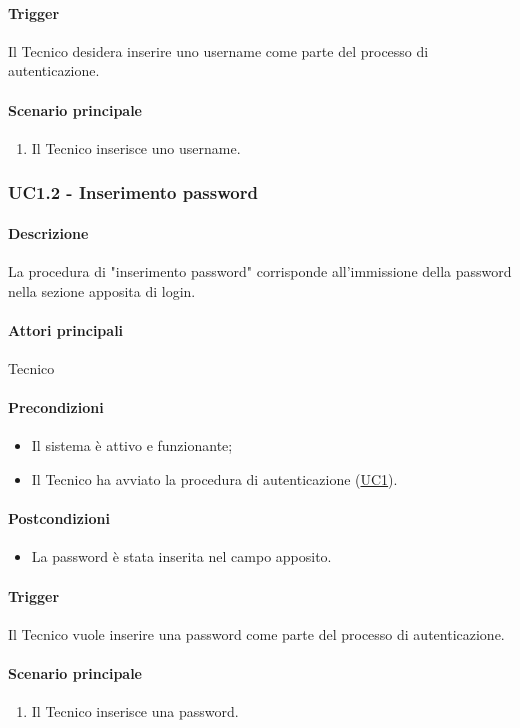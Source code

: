 \paragraph*{Trigger}
Il Tecnico desidera inserire uno username come parte del processo di autenticazione.

\paragraph*{Scenario principale}
\begin{enumerate}
  \item Il Tecnico inserisce uno username.
\end{enumerate}


\subsubsection{UC1.2 - Inserimento password}\label{UC1point2}
\paragraph*{Descrizione}
La procedura di "inserimento password" corrisponde all'immissione della password nella sezione apposita di login.

\paragraph*{Attori principali}
Tecnico

\paragraph*{Precondizioni}
\begin{itemize}
  \item Il sistema è attivo e funzionante;
  \item Il Tecnico ha avviato la procedura di autenticazione (\hyperref[UC1]{UC1}). 
\end{itemize}

\paragraph*{Postcondizioni}
\begin{itemize}
  \item La password è stata inserita nel campo apposito.
\end{itemize}

\paragraph*{Trigger}
Il Tecnico vuole inserire una password come parte del processo di autenticazione.

\paragraph*{Scenario principale}
\begin{enumerate}
  \item Il Tecnico inserisce una password.
\end{enumerate}
